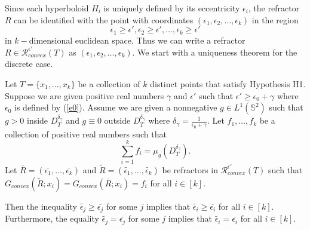 \documentclass[review]{elsarticle}
\begin{document}
Since each hyperboloid $H_i$ is uniquely defined by its eccentricity $\epsilon_i$, the refractor $R$ can be identified with the point with coordinates $(\epsilon_1,\epsilon_2,\dots,\epsilon_k)$ in the region
\begin{equation}
    \epsilon_1\ge\epsilon',\epsilon_2\ge\epsilon',\dots,\epsilon_k\ge\epsilon'
\end{equation}
in $k-$dimensional euclidean space. Thus we can write a refractor $R\in \mathcal{R}_{convex}^{\epsilon'}(T)$ as $(\epsilon_1, \epsilon_2,\dots,\epsilon_k).$ We start with a uniqueness theorem for the discrete case.




\begin{theorem}\label{unique}
    Let $T = \{x_1,\dots, x_k\}$ be a collection of $k$ distinct points that satisfy Hypothesis H1. Suppose we are given positive real numbers $\gamma$ and $\epsilon'$ such that $\epsilon'\ge \epsilon_0+\gamma$ where $\epsilon_0$ is defined by (\ref{e0}).  Assume we are given a nonnegative $g\in L^1(\mathbb{S}^2)$ such that $g>0$ inside $D_T^{\delta_\gamma}$ and $g\equiv 0$ outside $D_T^{\delta_\gamma}$ where $\delta_\gamma=\frac1{\epsilon_0+\gamma}$. Let $f_1,\dots,f_k$ be a collection of positive real numbers such that 
    \begin{equation}
        \sum_{i=1}^k f_i = \mu_{g}(D_T^{\delta_\gamma}).
    \end{equation}
    Let $\overline{R}=(\overline{\epsilon_1},\dots, \overline{\epsilon_k})$ and $\tilde{R}=(\tilde{\epsilon_1},\dots, \tilde{\epsilon_k})$ be refractors in $\mathcal{R}_{convex}^{\epsilon'}(T)$ such that $G_{convex}(\tilde{R};x_i)=G_{convex}(\overline{R};x_i)=f_i$ for all $i\in[k].$ 
    
    Then the inequality $\tilde{\epsilon_j}\ge \overline{\epsilon_j}$ for some $j$ implies that $\tilde{\epsilon_i}\ge \overline{\epsilon_i}$ for all $i\in[k].$ Furthermore, the equality $\tilde{\epsilon_j}= \overline{\epsilon_j}$ for some $j$ implies that $\tilde{\epsilon_i}= \overline{\epsilon_i}$ for all $i\in[k].$
\end{theorem}
\end{document}
